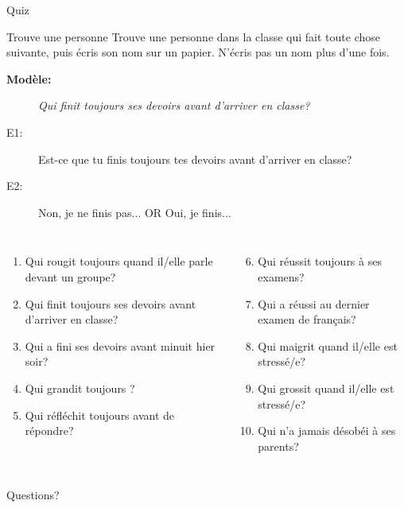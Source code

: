 \documentclass{beamer}
\begin{document}
  \begin{frame}{}
    \begin{center}
      \Large Quiz
    \end{center}
  \end{frame}

  \begin{frame}{Trouve une personne}
    Trouve une personne dans la classe qui fait toute chose suivante, puis écris son nom sur un papier.
    N'écris pas un nom plus d'une fois.
    \begin{description}
      \item[\textbf{Modèle:}] \emph{Qui finit toujours ses devoirs avant d'arriver en classe?}
      \item[E1:] Est-ce que tu finis toujours tes devoirs avant d'arriver en classe?
      \item[E2:] Non, je ne finis pas... OR Oui, je finis...
    \end{description}
    \begin{columns}[t]
      \scriptsize
        \begin{enumerate}
          \item Qui rougit toujours quand il/elle parle devant un groupe?
          \item Qui finit toujours ses devoirs avant d'arriver en classe?
          \item Qui a fini ses devoirs avant minuit hier soir?
          \item Qui grandit toujours ?
          \item Qui réfléchit toujours avant de répondre?
        \end{enumerate}
        \begin{enumerate}
          \setcounter{enumi}{5}
          \item Qui réussit toujours à ses examens?
          \item Qui a réussi au dernier examen de français?
          \item Qui maigrit quand il/elle est stressé/e?
          \item Qui grossit quand il/elle est stressé/e?
          \item Qui n'a jamais désobéi à ses parents?
        \end{enumerate}
    \end{columns}
  \end{frame}

  \begin{frame}{}
    \begin{center}
      \Large Questions?
    \end{center}
  \end{frame}
\end{document}
